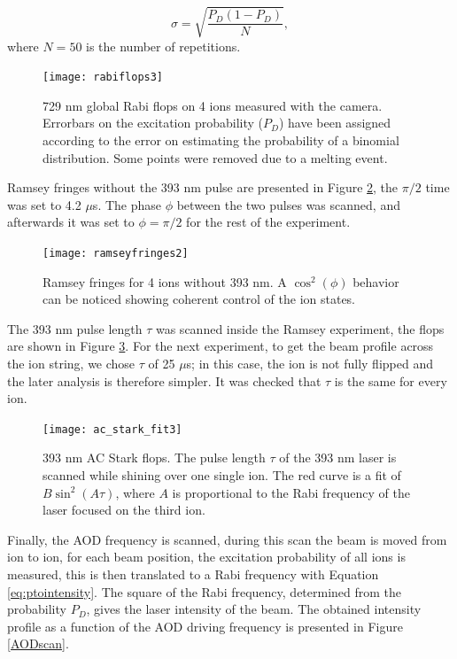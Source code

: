 \begin{equation}
\label{errorequation}
\sigma = \sqrt{\frac{P_{D}(1-P_{D})}{N}},
\end{equation}
where $N = 50$ is the number of repetitions.
\begin{figure}
\centering
\texttt{[image: rabiflops3]}
\caption{729 nm global Rabi flops on 4 ions measured with the camera. Errorbars on the excitation probability ($P_D$) have been assigned according to the error on estimating the probability of a binomial distribution. Some points were removed due to a melting event.}
\label{rabiflops4}
\end{figure}
Ramsey fringes without the 393 nm pulse are presented in Figure \ref{ramseyfringes}, the $\pi/2$ time was set to 4.2 $\mu$s. The phase $\phi$ between the two pulses was scanned, and afterwards it was set to $\phi = \pi/2$ for the rest of the experiment.
\begin{figure}
\centering
\texttt{[image: ramseyfringes2]}
\caption{Ramsey fringes for 4 ions without 393 nm. A $\cos^2(\phi)$ behavior can be noticed showing coherent control of the ion states.}
\label{ramseyfringes}
\end{figure}
The 393 nm pulse length $\tau$ was scanned inside the Ramsey experiment, the flops are shown in Figure \ref{ACscan}. For the next experiment, to get the beam profile across the ion string, we chose $\tau$ of 25 $\mu$s; in this case, the ion is not fully flipped and the later analysis is therefore simpler. It was checked that $\tau$ is the same for every ion.
\begin{figure}
\centering
\texttt{[image: ac\_stark\_fit3]}
\caption{393 nm AC Stark flops. The pulse length $\tau$ of the 393 nm laser is scanned while shining over one single ion. The red curve is a fit of $B\sin^2(A\tau)$, where $A$ is proportional to the Rabi frequency of the laser focused on the third ion.}
\label{ACscan}
\end{figure}
Finally, the AOD frequency is scanned, during this scan the beam is moved from ion to ion, for each beam position, the excitation probability of all ions is measured, this is then translated to a Rabi frequency with Equation \eqref{eq:ptointensity}. The square of the Rabi frequency, determined from the probability $P_D$, gives the laser intensity of the beam. The obtained intensity profile as a function of the AOD driving frequency is presented in Figure \ref{AODscan}.
